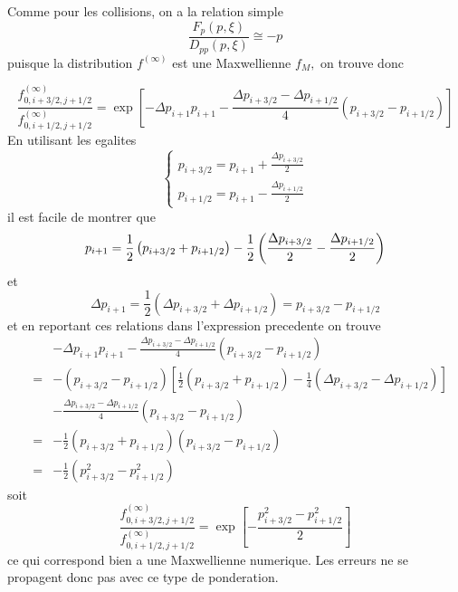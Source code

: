 Comme pour les collisions, on a la relation simple 
\[
\frac{F_{p}\left(p,\xi\right)}{D_{pp}\left(p,\xi\right)}\cong-p
\]
puisque la distribution $f^{(\infty)}$ est une Maxwellienne $f_{M},$ on
trouve donc

\[
\frac{f_{0,i+3/2,j+1/2}^{(\infty)}}{f_{0,i+1/2,j+1/2}^{(\infty)}}%
=\exp\left[-\Delta p_{i+1}p_{i+1}-\frac{\Delta p_{i+3/2}-\Delta p_{i+1/2}}{4}%
\left(p_{i+3/2}-p_{i+1/2}\right)\right]
\]
En utilisant les egalites 
\[
\left\{ 
\begin{array}{l}
p_{i+3/2}=p_{i+1}+\frac{\Delta p_{i+3/2}}{2} \\ 
p_{i+1/2}=p_{i+1}-\frac{\Delta p_{i+1/2}}{2}
\end{array}
\right.
\]
il est facile de montrer que 
\[
p_{i+1}=\frac{1}{2}\left(p_{i+3/2}+p_{i+1/2}\right)-\frac{1}{2}\left(\frac{%
\Delta p_{i+3/2}}{2}-\frac{\Delta p_{i+1/2}}{2}\right)
\]
et 
\[
\Delta p_{i+1}=\frac{1}{2}\left(\Delta p_{i+3/2}+\Delta
p_{i+1/2}\right)=p_{i+3/2}-p_{i+1/2}
\]
et en reportant ces relations dans l'expression precedente on trouve 
\begin{eqnarray*}
& & -\Delta p_{i+1}p_{i+1}-\frac{\Delta p_{i+3/2}-\Delta p_{i+1/2}}{4}%
\left(p_{i+3/2}-p_{i+1/2}\right) \\
& = & -\left(p_{i+3/2}-p_{i+1/2}\right)\left[\frac{1}{2}%
\left(p_{i+3/2}+p_{i+1/2}\right)-\frac{1}{4}\left(\Delta p_{i+3/2}-\Delta
p_{i+1/2}\right)\right] \\
& & -\frac{\Delta p_{i+3/2}-\Delta p_{i+1/2}}{4}\left(p_{i+3/2}-p_{i+1/2}%
\right) \\
& = & -\frac{1}{2}\left(p_{i+3/2}+p_{i+1/2}\right)\left(p_{i+3/2}-p_{i+1/2}%
\right) \\
& = & -\frac{1}{2}\left(p_{i+3/2}^{2}-p_{i+1/2}^{2}\right)
\end{eqnarray*}
soit 
\[
\frac{f_{0,i+3/2,j+1/2}^{(\infty)}}{f_{0,i+1/2,j+1/2}^{(\infty)}}=\exp\left[-%
\frac{p_{i+3/2}^{2}-p_{i+1/2}^{2}}{2}\right]
\]
ce qui correspond bien a une Maxwellienne numerique. Les erreurs ne se
propagent donc pas avec ce type de ponderation.

